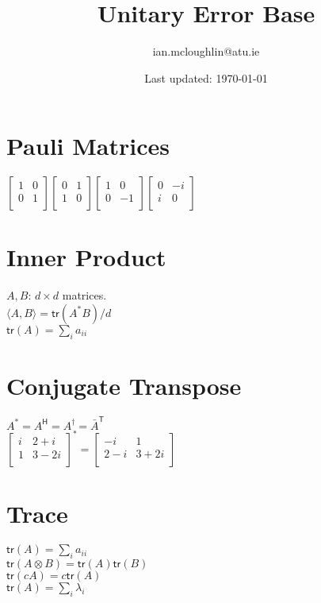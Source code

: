 \documentclass{iansnotes}
\title{Unitary Error Base}
\author{ian.mcloughlin@atu.ie}
\date{Last updated: \today}
\begin{document}
 
\maketitle

\section{Pauli Matrices}

$\begin{bmatrix}
  1 & 0 \\
  0 & 1 \\
\end{bmatrix}
\begin{bmatrix}
  0 & 1 \\
  1 & 0 \\
\end{bmatrix}
\begin{bmatrix}
  1 & 0 \\
  0 & -1 \\
\end{bmatrix}
\begin{bmatrix}
  0 & -i \\
  i & 0 \\
\end{bmatrix}$

\section{Inner Product}

$A, B$: $d \times d$ matrices.\\[2mm]
$\langle A, B \rangle = \textsf{tr}(A^* B) / d$\\[2mm]
$\textsf{tr}(A) = \sum_i a_{ii}$

\section{Conjugate Transpose}

$A^* = A^\textsf{H} = A^\dagger = \bar{A}^\textsf{T}$\\[4mm]
$\begin{bmatrix}
  i & 2+i \\
  1 & 3-2i \\
\end{bmatrix}^* = 
\begin{bmatrix}
  -i & 1 \\
  2-i & 3+2i \\
\end{bmatrix}$

\section{Trace}
$\textsf{tr}(A) = \sum_i a_{ii}$ \\[4mm]
$\textsf{tr}(A \otimes B) = \textsf{tr}(A) \textsf{tr}(B)$\\[4mm]
$\textsf{tr}(cA) = c\textsf{tr}(A)$\\[4mm]
$\textsf{tr}(A) = \sum_i \lambda_i$
\end{document}
